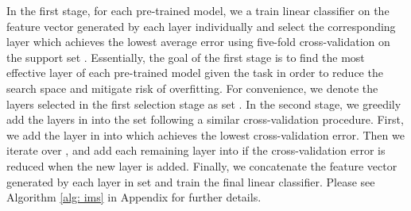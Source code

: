 \documentclass[runningheads]{llncs}
\begin{document}
In the first stage, for each pre-trained model, we a train linear classifier on the feature vector generated by each layer individually and select the corresponding layer which achieves the lowest average error using five-fold cross-validation on the support set . Essentially, the goal of the first stage is to find the most effective layer of each pre-trained model given the task in order to reduce the search space and mitigate risk of overfitting. For convenience, we denote the layers selected in the first selection stage as set . In the second stage, we greedily add the layers in  into the set  following a similar cross-validation procedure. First, we add the layer in  into  which achieves the lowest cross-validation error. Then we iterate over , and add each remaining layer into  if the cross-validation error is reduced when the new layer is added. Finally, we concatenate the feature vector generated by each layer in set  and train the final linear classifier. Please see Algorithm \ref{alg: ims} in Appendix for further details.
\end{document}
